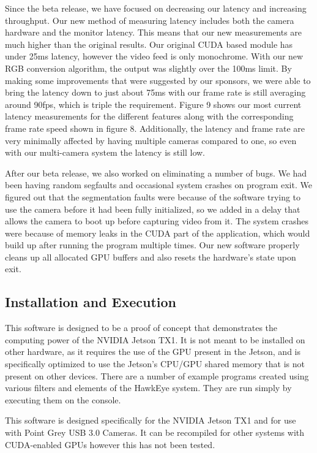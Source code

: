 \par
Since the beta release, we have focused on decreasing our latency and increasing throughput. Our new method of measuring latency includes both the camera hardware and the monitor latency. This means that our new measurements are much higher than the original results. Our original CUDA based module has under 25ms latency, however the video feed is only monochrome. With our new RGB conversion algorithm, the output was slightly over the 100ms limit. By making some improvements that were suggested by our sponsors, we were able to bring the latency down to just about 75ms with our frame rate is still averaging around 90fps, which is triple the requirement. Figure 9 shows our most current latency measurements for the different features along with the corresponding frame rate speed shown in figure 8. Additionally, the latency and frame rate are very minimally affected by having multiple cameras compared to one, so even with our multi-camera system the latency is still low.
\par
After our beta release, we also worked on eliminating a number of bugs. We had been having random segfaults and occasional system crashes on program exit. We figured out that the segmentation faults were because of the software trying to use the camera before it had been fully initialized, so we added in a delay that allows the camera to boot up before capturing video from it. The system crashes were because of memory leaks in the CUDA part of the application, which would build up after running the program multiple times. Our new software properly cleans up all allocated GPU buffers and also resets the hardware's state upon exit.\\

\subsection{Installation and Execution}
This software is designed to be a proof of concept that demonstrates the computing power of the NVIDIA Jetson TX1. It is not meant to be installed on other hardware, as it requires the use of the GPU present in the Jetson, and is specifically optimized to use the Jetson's CPU/GPU shared memory that is not present on other devices. There are a number of example programs created using various filters and elements of the HawkEye system. They are run simply by executing them on the console.
\par
This software is designed specifically for the NVIDIA Jetson TX1 and for use with Point Grey USB 3.0 Cameras. It can be recompiled for other systems with CUDA-enabled GPUs however this has not been tested.

